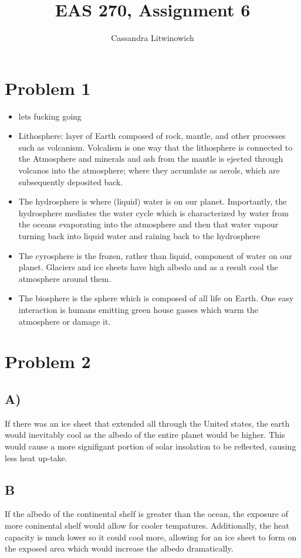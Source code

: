 \documentclass[12pt]{article}
\title{EAS 270, Assignment 6 }
\author{Cassandra Litwinowich}
\begin{document}
\maketitle

\section*{Problem 1}
\begin{itemize}
    \item lets fucking going
    \item Lithosphere: layer of Earth composed of rock, mantle, and other processes such as volcanism. Volcalism is one way that the lithosphere is connected to the Atmosphere and minerals and ash from the mantle is ejected through volcanos into the atmosphere; where they accumlate as aerols, which are subsequently deposited back.
    \item The hydrosphere is where (liquid) water is on our planet.  Importantly, the hydrosphere mediates the water cycle which is characterized by water from the oceans evaporating into the atmosphere and then that water vapour turning back into liquid water and raining back to the hydrosphere
    \item The cyrosphere is the frozen, rather than liquid, component of water on our planet. Glaciers and ice sheets have high albedo and as a result cool the atmosphere around them.
    \item The biosphere is the sphere which is composed of all life on Earth. One easy interaction is humans emitting green house gasses which warm the atmosphere or damage it.
\end{itemize}
\section*{Problem 2}
\subsection*{A)}
If there was an ice sheet that extended all through the United states, the earth would inevitably cool as the albedo of the entire planet would be higher. This would cause a more signifigant portion of solar insolation to be reflected, causing less heat up-take.
\subsection*{B}
If the albedo of the continental shelf is greater than the ocean, the exposure of more coninental shelf would allow for cooler tempatures. Additionally, the heat capacity is much lower so it could cool more, allowing for an ice sheet to form on the exposed area which would increase the albedo dramatically.
\end{document}

